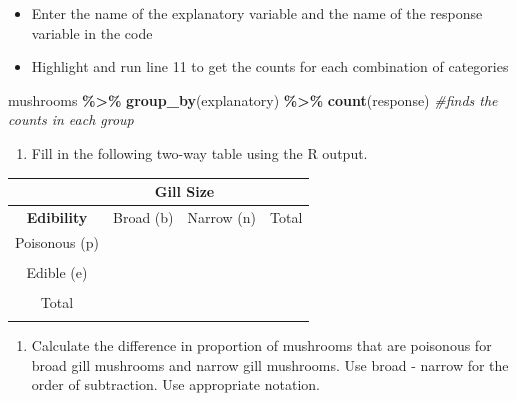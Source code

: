 \documentclass[
]{report}
\newenvironment{Shaded}{\begin{snugshade}}{\end{snugshade}}
\newcommand{\CommentTok}[1]{\textcolor[rgb]{0.56,0.35,0.01}{\textit{#1}}}
\newcommand{\FunctionTok}[1]{\textcolor[rgb]{0.13,0.29,0.53}{\textbf{#1}}}
\newcommand{\NormalTok}[1]{#1}
\newcommand{\SpecialCharTok}[1]{\textcolor[rgb]{0.81,0.36,0.00}{\textbf{#1}}}
\providecommand{\tightlist}{%
  \setlength{\itemsep}{0pt}\setlength{\parskip}{0pt}}
\begin{document}
\begin{itemize}
\item
  Enter the name of the explanatory variable and the name of the response variable in the code
\item
  Highlight and run line 11 to get the counts for each combination of categories
\end{itemize}

\begin{Shaded}
\begin{Highlighting}[]
\NormalTok{mushrooms }\SpecialCharTok{\%\textgreater{}\%} \FunctionTok{group\_by}\NormalTok{(explanatory) }\SpecialCharTok{\%\textgreater{}\%} \FunctionTok{count}\NormalTok{(response) }\CommentTok{\#finds the counts in each group}
\end{Highlighting}
\end{Shaded}

\begin{enumerate}
\def\labelenumi{\arabic{enumi}.}
\setcounter{enumi}{3}
\tightlist
\item
  Fill in the following two-way table using the R output.
\end{enumerate}

\begin{center}
\begin{tabular}{|c|c|c|c|}\hline
& \multicolumn{2}{|c|}{\textbf{Gill Size}} & \\ \hline
\textbf{Edibility} & \hspace{0.35in} Broad (b) \hspace{0.35in} & \hspace{0.35in} Narrow (n) \hspace{0.35in} & \hspace{0.35in} Total \hspace{0.35in} \\ \hline
 Poisonous (p) & & & \\ 
 & & & \\ \hline
Edible (e) & & & \\ 
 & & & \\ \hline
 Total & & & \\ 
 & & & \\ \hline
\end{tabular}
\end{center}

\begin{enumerate}
\def\labelenumi{\arabic{enumi}.}
\setcounter{enumi}{4}
\tightlist
\item
  Calculate the difference in proportion of mushrooms that are poisonous for broad gill mushrooms and narrow gill mushrooms. Use broad - narrow for the order of subtraction. Use appropriate notation.
\end{enumerate}
\end{document}
